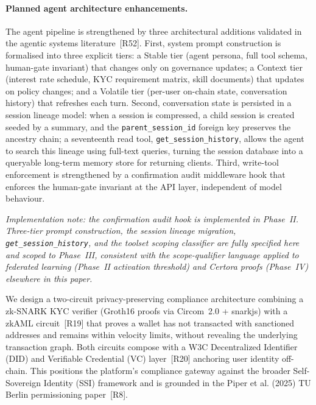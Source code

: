 \documentclass[12pt,a4paper]{report}
\begin{document}
\begin{description}[leftmargin=0pt]
\paragraph{Planned agent architecture enhancements.}
The agent pipeline is strengthened by three architectural additions validated in
the agentic systems literature~[R52]. First, system prompt
construction is formalised into three explicit tiers: a Stable tier (agent
persona, full tool schema, human-gate invariant) that changes only on governance
updates; a Context tier (interest rate schedule, KYC requirement matrix, skill
documents) that updates on policy changes; and a Volatile tier (per-user on-chain
state, conversation history) that refreshes each turn. Second, conversation state
is persisted in a session lineage model: when a session is compressed, a child
session is created seeded by a summary, and the \texttt{parent\_session\_id}
foreign key preserves the ancestry chain; a seventeenth read tool,
\texttt{get\_session\_history}, allows the agent to search this lineage using
full-text queries, turning the session database into a queryable long-term
memory store for returning clients. Third, write-tool enforcement is strengthened
by a confirmation audit middleware hook that enforces the human-gate invariant at
the API layer, independent of model behaviour.

\textit{Implementation note: the confirmation audit hook is implemented in
Phase~II. Three-tier prompt construction, the session lineage migration,
\texttt{get\_session\_history}, and the toolset scoping classifier are fully
specified here and scoped to Phase~III, consistent with the scope-qualifier
language applied to federated learning (Phase~II activation threshold) and
Certora proofs (Phase~IV) elsewhere in this paper.}

\item[\textbf{Contribution 4 --- Compliance-Aware ZKP / zkAML Identity Pathway.}]
We design a two-circuit privacy-preserving compliance architecture combining a zk-SNARK KYC verifier (Groth16 proofs via Circom~2.0 + snarkjs) with a zkAML circuit~[R19] that proves a wallet has not transacted with sanctioned addresses and remains within velocity limits, without revealing the underlying transaction graph. Both circuits compose with a W3C Decentralized Identifier (DID) and Verifiable Credential (VC) layer~[R20] anchoring user identity off-chain. This positions the platform's compliance gateway against the broader Self-Sovereign Identity (SSI) framework and is grounded in the Piper et al. (2025) TU Berlin permissioning paper~[R8].


\end{description}
\end{document}
